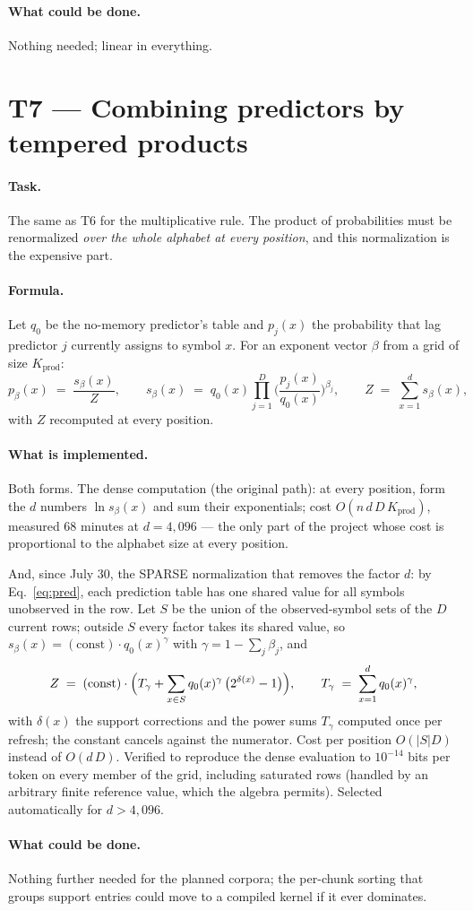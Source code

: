 \documentclass[11pt]{article}
\newcommand{\field}[1]{\paragraph{#1.}}
\begin{document}
\field{What could be done}
Nothing needed; linear in everything.

\section{T7 --- Combining predictors by tempered products}

\field{Task}
The same as T6 for the multiplicative rule.  The product of
probabilities must be renormalized \emph{over the whole alphabet at
every position}, and this normalization is the expensive part.

\field{Formula}
Let $q_0$ be the no-memory predictor's table and $p_j(x)$ the
probability that lag predictor $j$ currently assigns to symbol $x$.
For an exponent vector $\beta$ from a grid of size
$K_{\mathrm{prod}}$:
\[
  p_\beta(x) \;=\; \frac{s_\beta(x)}{Z}, \qquad
  s_\beta(x) \;=\; q_0(x) \prod_{j=1}^{D}
  \biggl(\frac{p_j(x)}{q_0(x)}\biggr)^{\!\beta_j}, \qquad
  Z \;=\; \sum_{x=1}^{d} s_\beta(x),
\]
with $Z$ recomputed at every position.

\field{What is implemented}
Both forms.  The dense computation (the original path): at every
position, form the $d$ numbers $\ln s_\beta(x)$ and sum their
exponentials; cost $O(n\, d\, D\, K_{\mathrm{prod}})$, measured
$68$ minutes at $d = 4{,}096$ --- the only part of the project whose
cost is proportional to the alphabet size at every position.

And, since July 30, the SPARSE normalization that removes the factor
$d$: by Eq.~\eqref{eq:pred}, each prediction table has one shared
value for all symbols unobserved in the row.  Let $S$ be the union
of the observed-symbol sets of the $D$ current rows; outside $S$
every factor takes its shared value, so
$s_\beta(x) = (\text{const}) \cdot q_0(x)^{\gamma}$ with
$\gamma = 1 - \sum_j \beta_j$, and
\[
  Z \;=\; (\text{const}) \cdot \Bigl( T_\gamma +
  \sum_{x \in S} q_0(x)^{\gamma}\,
  \bigl(2^{\delta(x)} - 1\bigr) \Bigr),
  \qquad
  T_\gamma \;=\; \sum_{x=1}^{d} q_0(x)^{\gamma},
\]
with $\delta(x)$ the support corrections and the power sums
$T_\gamma$ computed once per refresh; the constant cancels against
the numerator.  Cost per position $O(|S| D)$ instead of $O(d\,D)$.
Verified to reproduce the dense evaluation to $10^{-14}$
bits per token on every member of the grid, including saturated rows
(handled by an arbitrary finite reference value, which the algebra
permits).  Selected automatically for $d > 4{,}096$.

\field{What could be done}
Nothing further needed for the planned corpora; the per-chunk
sorting that groups support entries could move to a compiled kernel
if it ever dominates.
\end{document}
